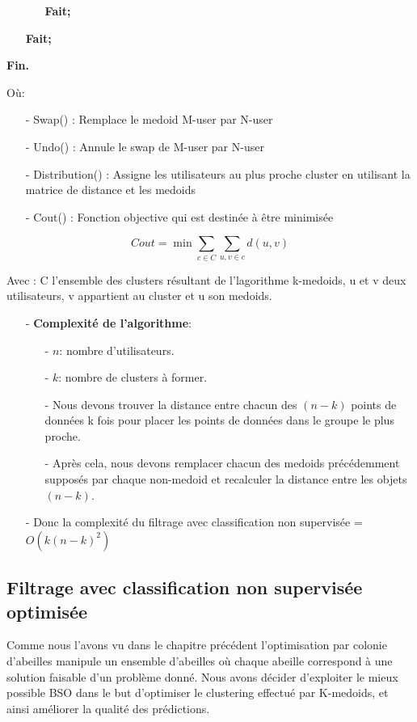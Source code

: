 \begin{algorithm}[H]
\begin{itemize}
\begin{itemize}
\begin{itemize}
			\end{itemize}
			\item []\textbf{Fait;}
		\end{itemize}
		\item []\textbf{Fait;}
		\end{itemize}

	\hspace*{\algorithmicindent}\textbf{ Fin.}	
\end{algorithm}

Où: 
\begin{itemize}
	\item [-] Swap() : Remplace le medoid M-user par N-user
	\item [-] Undo() : Annule le swap de M-user par N-user
	\item [-] Distribution() : Assigne les utilisateurs au plus proche cluster en utilisant la matrice de distance et les medoids 
	\item [-] Cout() : Fonction objective qui est destinée à être minimisée
\end{itemize}

\begin{equation}
Cout=\min\sum_{c \in C}\sum_{u,v \in c}d(u,v)
\end{equation}

Avec : C l'ensemble des clusters résultant de l'lagorithme k-medoids, u et v deux utilisateurs, v appartient au cluster et u son medoids.

\begin{itemize}
	\item [-] \textbf{Complexité de l'algorithme}:
	\begin{itemize}
		\item [-] $n$: nombre d'utilisateurs.
		\item [-] $k$: nombre de clusters à former.
		\item [-] Nous devons trouver la distance entre chacun des $(n-k)$ points de données k fois pour placer les points de données dans le groupe le plus proche.
		\item [-] Après cela, nous devons remplacer chacun des medoids précédemment supposés par chaque non-medoid et recalculer la distance entre les objets $(n-k)$.
	\end{itemize}
	\item [-]  Donc la complexité du filtrage avec classification non supervisée = $O(k(n-k)^2)$
\end{itemize}


\subsection{Filtrage avec classification non supervisée optimisée}
Comme nous l'avons vu dans le chapitre précédent l'optimisation par colonie d'abeilles manipule un ensemble d'abeilles où chaque abeille correspond à une solution faisable d'un problème donné.
Nous avons décider d'exploiter le mieux possible BSO dans le but d'optimiser le clustering effectué par K-medoids, et ainsi améliorer la qualité des prédictions.

